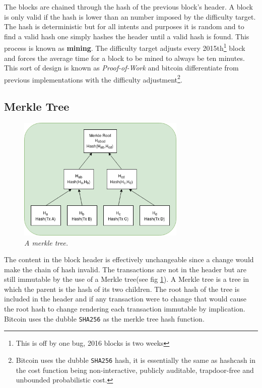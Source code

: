 The blocks are chained through the hash of the previous block's header. A block is only valid if the hash is lower than an number imposed by the difficulty target. The hash is deterministic but for all intents and purposes it is random and to find a valid hash one simply hashes the header until a valid hash is found. This process is known as \textbf{mining}. The difficulty target adjusts every 2015th\footnote{This is off by one bug, 2016 blocks is two weeks} block\cite{repository:bitcoin} and forces the average time for a block to be mined to always be ten minutes. This sort of design is known as \textit{Proof-of-Work} and bitcoin differentiate from previous implementations with the difficulty adjustment\cite{back:hashcash}\footnote{Bitcoin uses the dubble \texttt{SHA256} hash, it is essentially the same as hashcash in the cost function being non-interactive, publicly auditable, trapdoor-free and unbounded probabilistic cost\cite{back:hashcash}.}.

\subsection{Merkle Tree}

\begin{figure}[!htb]
	
	\centering
	\includegraphics[width=8cm]{merkle.png}
	\caption{\textit{A merkle tree. 
	}}
	\label{fig:merkle:tree}
	
\end{figure}

The content in the block header is effectively unchangeable since a change would make the chain of hash invalid. The transactions are not in the header but are still immutable by the use of a Merkle tree(see fig \ref{fig:merkle:tree}). A Merkle tree is a tree in which the parent is the hash of its two children. The root hash of the tree is included in the header and if any transaction were to change that would cause the root hash to change rendering each transaction immutable by implication. Bitcoin uses the dubble \texttt{SHA256} as the merkle tree hash function.

